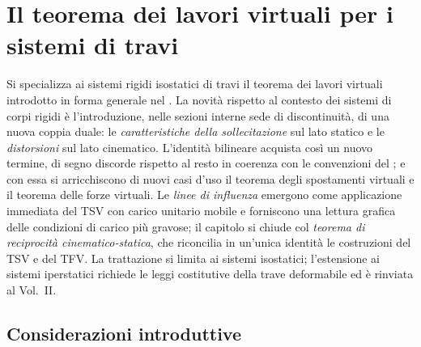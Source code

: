 \graphicspath{{Parti/P04-Travi_rigide/C07-TLV_travi/Figure/}}
\chapter{Il teorema dei lavori virtuali per i sistemi di travi}
\label{cap:TLV_travi}

\begin{sommario}
	Si specializza ai sistemi rigidi isostatici di travi
	il teorema dei lavori virtuali introdotto in forma
	generale nel . La novità rispetto al
	contesto dei sistemi di corpi rigidi è l'introduzione,
	nelle sezioni interne sede di discontinuità, di una
	nuova coppia duale: le \emph{caratteristiche della
		sollecitazione} sul lato statico e le
	\emph{distorsioni} sul lato cinematico. L'identità
	bilineare acquista così un nuovo termine, di segno
	discorde rispetto al resto in coerenza con le
	convenzioni del ; e con essa
	si arricchiscono di nuovi casi d'uso il teorema degli
	spostamenti virtuali e il teorema delle forze
	virtuali. Le \emph{linee di influenza} emergono come
	applicazione immediata del TSV con carico unitario
	mobile e forniscono una lettura grafica delle
	condizioni di carico più gravose; il capitolo si
	chiude col \emph{teorema di reciprocità
		cinematico-statica}, che riconcilia in un'unica
	identità le costruzioni del TSV e del TFV. La
	trattazione si limita ai sistemi isostatici;
	l'estensione ai sistemi iperstatici richiede le leggi
	costitutive della trave deformabile ed è rinviata al
	Vol.~II.
\end{sommario}




\section*{Considerazioni introduttive}
\label{sec:raccordo_TLV_travi}

